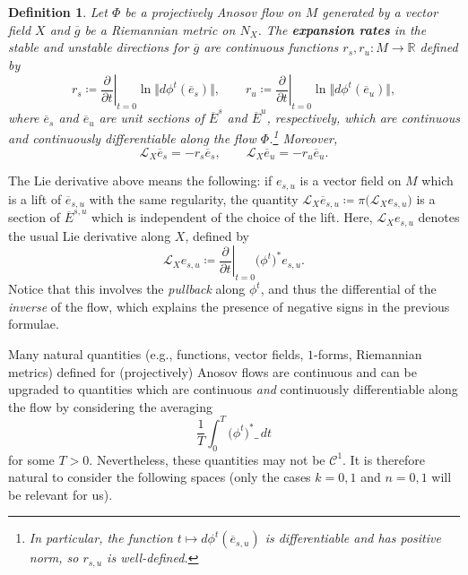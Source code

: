 \documentclass[letterpaper, 11pt]{article}
\numberwithin{equation}{section}
\newtheorem{defn}[thm]{Definition}
\newcommand{\R}{\mathbb{R}}
\begin{document}
\begin{defn} Let $\Phi$ be a projectively Anosov flow on $M$ generated by a vector field $X$ and $\overline{g}$ be a Riemannian metric on $N_X$. The \textbf{expansion rates} in the stable and unstable directions for $\overline{g}$ are continuous functions $r_s, r_u : M \rightarrow \R$ defined by $$ r_s \coloneqq \left. \frac{\partial}{\partial t}\right\rvert_{t=0} \ln \Vert d\phi^t (\overline{e}_s)\Vert, \qquad r_u \coloneqq \left. \frac{\partial}{\partial t}\right\rvert_{t=0} \ln \Vert d\phi^t (\overline{e}_u)\Vert,$$
where $\overline{e}_s$ and $\overline{e}_u$ are unit sections of $\overline{E}^s$ and $\overline{E}^u$, respectively, which are continuous and continuously differentiable along the flow $\Phi$.\footnote{In particular, the function $t \mapsto d\phi^t(\overline{e}_{s,u})$ is differentiable and has positive norm, so $r_{s,u}$ is well-defined.} Moreover, $$\mathcal{L}_X \overline{e}_s = -r_s \overline{e}_s, \qquad \mathcal{L}_X \overline{e}_u = -r_u \overline{e}_u.$$
\end{defn}

The Lie derivative above means the following: if $e_{s,u}$ is a vector field on $M$ which is a lift of $\overline{e}_{s,u}$ with the same regularity, the quantity $\mathcal{L}_X \overline{e}_{s,u} \coloneqq \pi\big(\mathcal{L}_X e_{s,u}\big)$ is a section of $\overline{E}^{s,u}$ which is independent of the choice of the lift. Here, $\mathcal{L}_X e_{s,u}$ denotes the usual Lie derivative along $X$, defined by
$$\mathcal{L}_X e_{s,u} \coloneqq \left. \frac{\partial}{\partial t}\right\rvert_{t=0} \big(\phi^t\big)^* e_{s,u}.$$ Notice that this involves the \emph{pullback} along $\phi^t$, and thus the differential of the \emph{inverse} of the flow, which explains the presence of negative signs in the previous formulae.

Many natural quantities (e.g., functions, vector fields, $1$-forms, Riemannian metrics) defined for (projectively) Anosov flows are continuous and can be upgraded to quantities which are continuous \emph{and} continuously differentiable along the flow by considering the averaging $$\frac{1}{T}\int_0^T \big(\phi^t\big)^*\_ \, dt$$ for some $T>0$. Nevertheless, these quantities may not be $\mathcal{C}^1$. It is therefore natural to consider the following spaces (only the cases $k=0,1$ and $n=0,1$ will be relevant for us).
\end{document}
